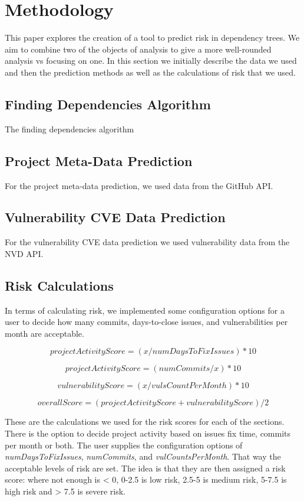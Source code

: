 \documentclass[10pt, compsoc, conference]{IEEEtran}
\begin{document}
\section{Methodology}
This paper explores the creation of a tool to predict risk in dependency trees. We aim to combine two of the objects of analysis to give a more well-rounded analysis vs focusing on one. In this section we initially describe the data we used and then the prediction methods as well as the calculations of risk that we used. 

\subsection{Finding Dependencies Algorithm}
The finding dependencies algorithm 

\subsection{Project Meta-Data Prediction}
For the project meta-data prediction, we used data from the GitHub API. 

\subsection{Vulnerability CVE Data Prediction}
For the vulnerability CVE data prediction we used vulnerability data from the NVD API.

\subsection{Risk Calculations}
In terms of calculating risk, we implemented some configuration options for a user to decide how many commits, days-to-close issues, and vulnerabilities per month are acceptable. 

\[ projectActivityScore = ( x / numDaysToFixIssues ) * 10\]

\[ projectActivityScore = ( numCommits / x ) * 10\]

\[vulnerabilityScore = ( x / vulsCountPerMonth ) * 10\]

\[overallScore = ( projectActivityScore + vulnerabilityScore) / 2\]

These are the calculations we used for the risk scores for each of the sections. There is the option to decide project activity based on issues fix time, commits per month or both. The user supplies the configuration options of \textit{numDaysToFixIssues}, \textit{numCommits}, and \textit{vulCountsPerMonth}. That way the acceptable levels of risk are set. The idea is that they are then assigned a risk score: where not enough is < 0, 0-2.5 is low risk, 2.5-5 is medium risk, 5-7.5 is high risk and > 7.5 is severe risk. 
\end{document}

